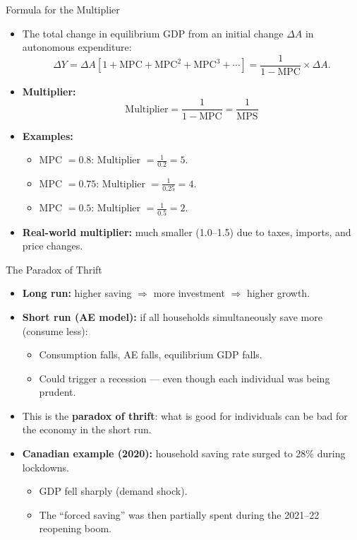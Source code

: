 \documentclass[aspectratio=169]{beamer}
\begin{document}
\begin{frame}{Formula for the Multiplier}
\transfade
\begin{itemize}
  \item The total change in equilibrium GDP from an initial change $\Delta A$ in autonomous expenditure:
  \[
    \Delta Y = \Delta A \left[1 + \text{MPC} + \text{MPC}^2 + \text{MPC}^3 + \cdots \right]
            = \frac{1}{1 - \text{MPC}} \times \Delta A.
  \]
  \item \textbf{Multiplier:}
  \[
    \boxed{\text{Multiplier} = \frac{1}{1 - \text{MPC}} = \frac{1}{\text{MPS}}}
  \]
  \item \textbf{Examples:}
  \begin{itemize}
    \item MPC $= 0.8$: Multiplier $= \frac{1}{0.2} = 5$.
    \item MPC $= 0.75$: Multiplier $= \frac{1}{0.25} = 4$.
    \item MPC $= 0.5$: Multiplier $= \frac{1}{0.5} = 2$.
  \end{itemize}
  \item \textbf{Real-world multiplier:} much smaller (1.0--1.5) due to taxes, imports, and price changes.
\end{itemize}
\end{frame}

\begin{frame}{The Paradox of Thrift}
\transfade
\begin{itemize}
  \item \textbf{Long run:} higher saving $\Rightarrow$ more investment $\Rightarrow$ higher growth.
  \item \textbf{Short run (AE model):} if all households simultaneously save more (consume less):
  \begin{itemize}
    \item Consumption falls, AE falls, equilibrium GDP falls.
    \item Could trigger a recession --- even though each individual was being prudent.
  \end{itemize}
  \item This is the \textbf{paradox of thrift}: what is good for individuals can be bad for the economy in the short run.
  \item \textbf{Canadian example (2020):} household saving rate surged to \alert{28\%} during lockdowns.
  \begin{itemize}
    \item GDP fell sharply (demand shock).
    \item The ``forced saving'' was then partially spent during the 2021--22 reopening boom.
  \end{itemize}
\end{itemize}
\end{frame}
\end{document}
